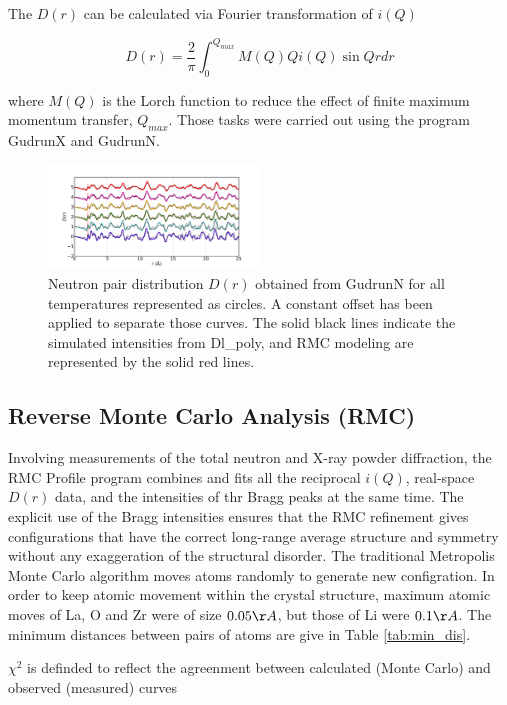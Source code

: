 \documentclass[twoside,twocolumn,9pt]{article}
\begin{document}
The $D(r)$ can be calculated via Fourier transformation of $i(Q)$

\begin{equation}\label{fun:dofr_1}
D(r)=\frac{2}{\pi}\int^{Q_{max}}_{0} M(Q)Qi(Q)\sin{Qr}dr
\end{equation}

where $M(Q)$ is the Lorch function to reduce the effect of finite maximum momentum transfer, $Q_{max}$. Those tasks were carried out using the program GudrunX and GudrunN.


\begin{figure}
\centering
\includegraphics[width=0.5\textwidth]{Pics/npdf.pdf}
\caption{Neutron pair distribution $D(r)$  obtained from GudrunN for all temperatures represented as circles.
 A constant offset has been applied to separate those curves.
 The solid black lines indicate the  simulated intensities from Dl\_poly, and RMC modeling are represented by the solid red lines. }
\label{fig:npdf}
\end{figure}

\subsection{Reverse Monte Carlo Analysis (RMC)}

Involving measurements of the total neutron and X-ray powder diffraction,
the RMC Profile program combines and fits all the reciprocal $i(Q)$, real-space $D(r)$ data, and the intensities of thr Bragg peaks at the same time.
The explicit use of the Bragg intensities ensures that the RMC refinement gives configurations that have the correct
long-range average structure and symmetry without any exaggeration of the structural disorder.
The traditional Metropolis Monte Carlo algorithm moves atoms randomly to generate new configration.
In order to keep atomic movement within the crystal structure,
maximum atomic moves of La, O and Zr were of size $0.05 \AA$, but those of Li were $0.1 \AA$.
The minimum distances between pairs of atoms are give in Table  \ref{tab:min_dis}.

$\chi^2$ is definded to reflect the agreenment  between calculated (Monte Carlo) and observed (measured) curves
\end{document}
